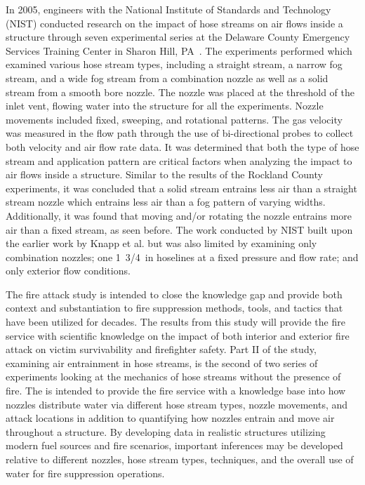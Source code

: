 \documentclass[12pt,oneside]{book}
\begin{document}
In 2005, engineers with the National Institute of Standards and Technology (NIST) conducted research on the impact of hose streams on air flows inside a structure through seven experimental series at the Delaware County Emergency Services Training Center in Sharon Hill, PA~\cite{NISTHoseStreams}. The experiments performed which examined various hose stream types, including a straight stream, a narrow fog stream, and a wide fog stream from a combination nozzle as well as a solid stream from a smooth bore nozzle. The nozzle was placed at the threshold of the inlet vent, flowing water into the structure for all the experiments. Nozzle movements included fixed, sweeping, and rotational patterns. The gas velocity was measured in the flow path through the use of bi-directional probes to collect both velocity and air flow rate data. It was determined that both the type of hose stream and application pattern are critical factors when analyzing the impact to air flows inside a structure. Similar to the results of the Rockland County experiments, it was concluded that a solid stream entrains less air than a straight stream nozzle which entrains less air than a fog pattern of varying widths. Additionally, it was found that moving and/or rotating the nozzle entrains more air than a fixed stream, as seen before. The work conducted by NIST built upon the earlier work by Knapp et al. but was also limited by examining only combination nozzles; one 1~3/4~in hoselines at a fixed pressure and flow rate; and only exterior flow conditions.

The fire attack study is intended to close the knowledge gap and provide both context and substantiation to fire suppression methods, tools, and tactics that have been utilized for decades. The results from this study will provide the fire service with scientific knowledge on the impact of both interior and exterior fire attack on victim survivability and firefighter safety. Part II of the study, examining air entrainment in hose streams, is the second of two series of experiments looking at the mechanics of hose streams without the presence of fire. The is intended to provide the fire service with a knowledge base into how nozzles distribute water via different hose stream types, nozzle movements, and attack locations in addition to quantifying how nozzles entrain and move air throughout a structure. By developing data in realistic structures utilizing modern fuel sources and fire scenarios, important inferences may be developed relative to different nozzles, hose stream types, techniques, and the overall use of water for fire suppression operations.
\end{document}
